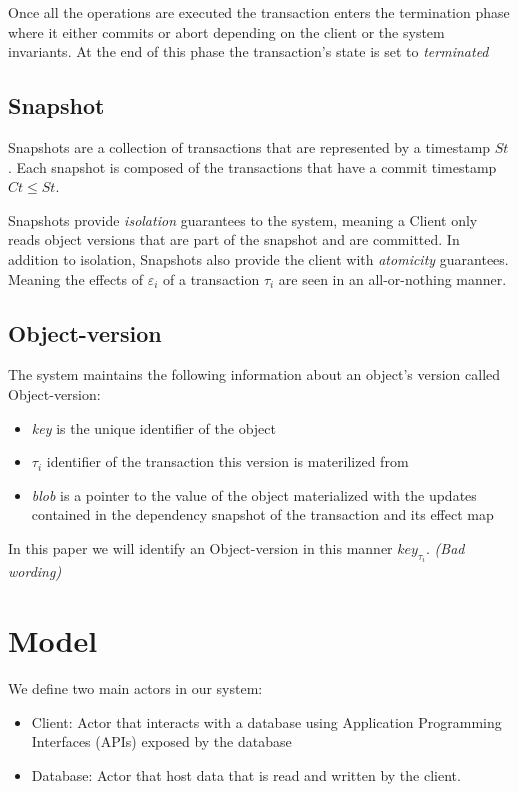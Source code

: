 \documentclass[parallelisme]{compas2022}
\begin{document}
Once all the operations are executed the transaction enters the termination phase where it either commits or abort depending on the client or the system invariants. 
At the end of this phase the transaction's state is set to \emph{terminated}

\subsection{Snapshot}

Snapshots are a collection of transactions that are represented by a timestamp $St$.
Each snapshot is composed of the transactions that have a commit timestamp $Ct \leq St$. 

Snapshots provide \emph{isolation} guarantees to the system, meaning a Client only reads object versions that are part of the snapshot and are committed. 
In addition to isolation, Snapshots also provide the client with \emph{atomicity} guarantees.
Meaning the effects of $\varepsilon_i$ of a transaction $\tau_i$ are seen in an all-or-nothing manner.

\subsection{Object-version}

The system maintains the following information about an object's version called Object-version: 
\begin{itemize}
  \item \emph{key} is the unique identifier of the object
  \item \emph{$\tau_i$} identifier of the transaction this version is materilized from
  \item \emph{blob} is a pointer to the value of the object materialized with the updates contained in the dependency snapshot of the transaction and its effect map
\end{itemize}

In this paper we will identify an Object-version in this manner $key_{\tau_i}$. \emph{(Bad wording)}

\section{Model}


We define two main actors in our system:
\begin{itemize}
  \item Client: Actor that interacts with a database using Application Programming Interfaces (APIs) exposed by the database
  \item Database: Actor that host data that is read and written by the client.
\end{itemize}
\end{document}
